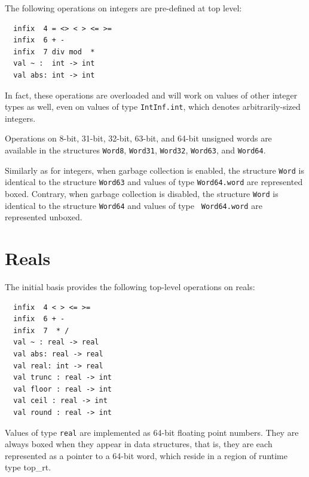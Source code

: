 \documentclass[12pt]{book}
\begin{document}
The following operations on integers are pre-defined at top level:
%
%
%
%
%
%
%
%
%
%
%
%
%
\begin{verbatim}
  infix  4 = <> < > <= >=
  infix  6 + -
  infix  7 div mod  *
  val ~ :  int -> int
  val abs: int -> int
\end{verbatim}

In fact, these operations are overloaded and will work on values of
other integer types as well, even on values of type {\tt IntInf.int},
which denotes arbitrarily-sized integers.

Operations on 8-bit, 31-bit, 32-bit, 63-bit, and 64-bit unsigned words are available
in the structures
%
{\tt Word8},
%
{\tt Word31},
%
{\tt Word32},
%
{\tt Word63}, and
%
{\tt Word64}.

Similarly as for integers, when garbage collection is enabled, the
structure {\tt Word} is identical to the structure {\tt Word63} and
values of type {\tt Word64.word} are represented boxed. Contrary,
when garbage collection is disabled, the structure {\tt Word} is
identical to the structure {\tt Word64} and values of type {\tt
  Word64.word} are represented unboxed.

\section{Reals}
The
%
initial basis provides the following top-level operations on reals:
%
%
%
%
%
%
%
%
%
%
%
%
%
%
%
%
%
\begin{verbatim}
  infix  4 < > <= >=
  infix  6 + -
  infix  7  * /
  val ~ : real -> real
  val abs: real -> real
  val real: int -> real
  val trunc : real -> int
  val floor : real -> int
  val ceil : real -> int
  val round : real -> int
\end{verbatim}
Values of type {\tt real} are implemented as 64-bit floating point
numbers.  They are always boxed when they appear in data structures, that is, they are each represented as a pointer to
a 64-bit
%
word, which reside in a region of runtime type {\sc top\_rt}.
\end{document}
